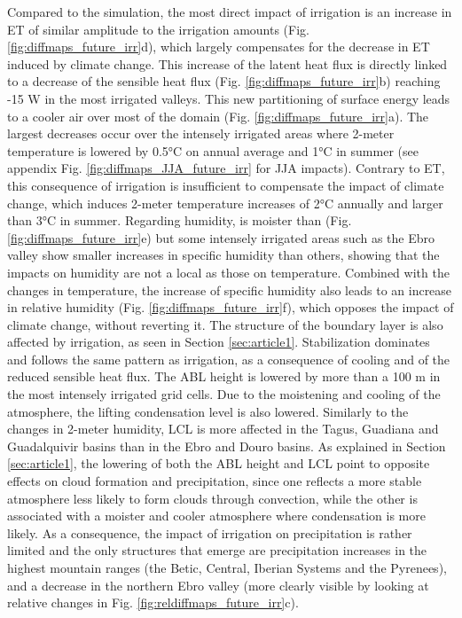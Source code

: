 Compared to the \futnoirr simulation, the most direct impact of irrigation is an increase in ET of similar amplitude to the irrigation amounts (Fig. \ref{fig:diffmaps_future_irr}d), which largely compensates for the decrease in ET induced by climate change. This increase of the latent heat flux is directly linked to a decrease of the sensible heat flux (Fig. \ref{fig:diffmaps_future_irr}b) reaching -15 W \persqm in the most irrigated valleys. 
This new partitioning of surface energy leads to a cooler air over most of the domain (Fig. \ref{fig:diffmaps_future_irr}a). The largest decreases occur  over the intensely irrigated areas where 2-meter temperature is lowered by 0.5°C on annual average and 1°C in summer (see appendix Fig. \ref{fig:diffmaps_JJA_future_irr} for JJA impacts). 
Contrary to ET, this consequence of irrigation is insufficient to compensate the impact of climate change, which induces 2-meter temperature increases of 2°C annually and larger than 3°C in summer.
Regarding humidity, \futirr is moister than \futnoirr (Fig. \ref{fig:diffmaps_future_irr}e) but some intensely irrigated areas such as the Ebro valley show smaller increases in specific humidity than others, showing that the impacts on humidity are not a local as those on temperature. Combined with the changes in temperature, the increase of specific humidity also leads to an increase in relative humidity  (Fig. \ref{fig:diffmaps_future_irr}f), which opposes the impact of climate change, without reverting it.
The structure of the boundary layer is also affected by irrigation, as seen in Section \ref{sec:article1}. Stabilization dominates and follows the same pattern as irrigation, as a consequence of cooling and of the reduced sensible heat flux. The ABL height is lowered by more than a 100 m in the most intensely irrigated grid cells. 
Due to the moistening and cooling of the atmosphere, the lifting condensation level is also lowered. Similarly to the changes in 2-meter humidity, LCL is more affected in the Tagus, Guadiana and Guadalquivir basins than in the Ebro and Douro basins.
As explained in Section \ref{sec:article1}, the lowering of both the ABL height and LCL point to opposite effects on cloud formation and precipitation, since one reflects a more stable atmosphere less likely to form clouds through convection, while the other is associated with a moister and cooler atmosphere where condensation is more likely. As a consequence, the impact of irrigation on precipitation is rather limited and the only structures that emerge are precipitation increases in the highest mountain ranges (the Betic, Central, Iberian Systems and the Pyrenees), and a decrease in the northern Ebro valley (more clearly visible by looking at relative changes in Fig. \ref{fig:reldiffmaps_future_irr}c).

